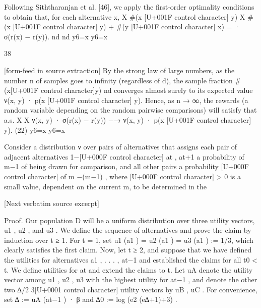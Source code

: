 \documentclass[10pt]{article}
\begin{document}
\begin{ReviewVerbatim}
Following Siththaranjan et al. [46], we apply the first-order optimality conditions to obtain that, for
each alternative x,
                  X #(x [U+001F control character] y) X #(x [U+001F control character] y) + #(y [U+001F control character] x)
                                  =                               · σ(r(x) − r(y)).
                         nd                        nd
                      y6=x                    y6=x


                                                              38

[form-feed in source extraction]
By the strong law of large numbers, as the number n of samples goes to infinity (regardless of d), the
sample fraction #(x[U+001F control character]y)
                   nd    converges almost surely to its expected value ν({x, y}) · p(x [U+001F control character] y). Hence,
as n → ∞, the rewards (a random variable depending on the random pairwise comparisons) will
satisfy that
                                                   a.s.
                  X                                     X
                       ν({x, y}) · σ(r(x) − r(y)) −→        ν({x, y}) · p(x [U+001F control character] y).                (22)
                     y6=x                                     y6=x

Consider a distribution ν over pairs of alternatives that assigns each pair of adjacent alternatives
                              1−[U+000F control character]
{at , at+1 } a probability of m−1 of being drawn for comparison, and all other pairs a probability
         [U+000F control character]
of m −(m−1) , where [U+000F control character] > 0 is a small value, dependent on the current m, to be determined in the

[Next verbatim source excerpt]

  Proof. Our population D will be a uniform distribution over three utility vectors, u1 , u2 , and u3 . We
  define the sequence of alternatives and prove the claim by induction over t ≥ 1.
  For t = 1, set u1 (a1 ) = u2 (a1 ) = u3 (a1 ) := 1/3, which clearly satisfies the first claim.
  Now, let t ≥ 2, and suppose that we have defined the utilities for alternatives a1 , . . . , at−1 and
  established the claims for all t0 < t. We define utilities for at and extend the claims to t. Let uA
  denote the utility vector among u1 , u2 , u3 with the highest utility for at−1 , and denote the other two
                                                                                            ∆/2    3[U+0001 control character]
  utility vectors by uB , uC . For convenience, set ∆ := uA (at−1 ) · β and ∆0 := log (e2 (e∆+1)+3) .


\end{ReviewVerbatim}
\end{document}
